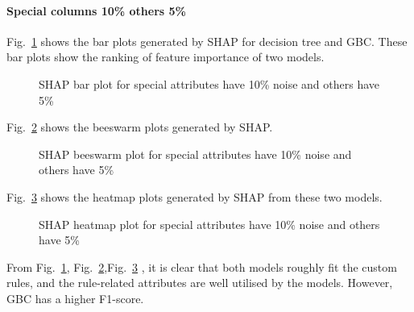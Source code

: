 \documentclass[runningheads,a4paper]{llncs}
\begin{document}
\paragraph{Special columns 10\% others 5\%}
Fig.~\ref{bar plots special_higher 10} shows the bar plots generated by SHAP for decision tree and GBC. These bar plots show the ranking of feature importance of two models.
\begin{figure}[H]
	\centering
	
	\hfill
	
	
	\caption{SHAP bar plot for special attributes have 10\% noise and others have 5\% }
	\label{bar plots special_higher 10}
\end{figure}
Fig.~\ref{bee plots special_higher 10} shows the beeswarm plots generated by SHAP.
\begin{figure}[H]
	\centering
	
	\hfill
	
	
	\caption{SHAP beeswarm plot for special attributes have 10\% noise and others have 5\% }
	\label{bee plots special_higher 10}
	
\end{figure}
Fig.~\ref{heat plots special_higher 10} shows the heatmap plots generated by SHAP from these two models.
\begin{figure}[H]
	\centering
	
	\hfill
	
	
	\caption{SHAP heatmap plot for special attributes have 10\% noise and others have 5\%}
	\label{heat plots special_higher 10}
	
\end{figure}
From Fig.~\ref{bar plots special_higher 10}, Fig.~\ref{bee plots special_higher 10},Fig.~\ref{heat plots special_higher 10} , it is clear that both models roughly fit the custom rules, and the rule-related attributes are well utilised by the models. However, GBC has a higher F1-score.
\end{document}
